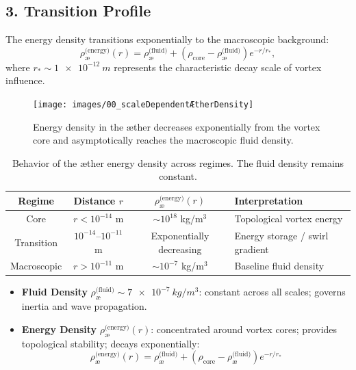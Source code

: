 \subsection*{3. Transition Profile}

The energy density transitions exponentially to the macroscopic background:
\begin{equation}
    \rho_{\text{\ae}}^{\text{(energy)}}(r) =
    \rho_{\text{\ae}}^{\text{(fluid)}} +
    \left(\rho_{\text{core}} - \rho_{\text{\ae}}^{\text{(fluid)}}\right)
    e^{-r/r_*},
\end{equation}
where \( r_* \sim \SI{1e-12}{m} \) represents the characteristic decay scale of vortex influence.

\begin{figure}[htbp]
    \centering
    \texttt{[image: images/00\_scaleDependentÆtherDensity]}
    \caption{Energy density in the æther decreases exponentially from the vortex core and asymptotically reaches the macroscopic fluid density.}
    \label{fig:vortexfields2}
\end{figure}

\begin{table}[h!]
    \centering
    \begin{tabular}{|c|c|c|l|}
        \hline
        Regime & Distance $r$ & $\rho_{\text{\ae}}^{\text{(energy)}}(r)$ & Interpretation \\
        \hline
        Core & $r < 10^{-14}$ m & $\sim 10^{18}$ kg/m$^3$ & Topological vortex energy \\
        Transition & $10^{-14}$–$10^{-11}$ m & Exponentially decreasing & Energy storage / swirl gradient \\
        Macroscopic & $r > 10^{-11}$ m & $\sim 10^{-7}$ kg/m$^3$ & Baseline fluid density \\
        \hline
    \end{tabular}
    \caption{Behavior of the æther energy density across regimes. The fluid density remains constant.}
\end{table}

\begin{tcolorbox}[colback=blue!3, colframe=black!70, sharp corners=southwest, title=Æther Density Types in VAM]
    \begin{itemize}
        \item \textbf{Fluid Density} \(\rho_{\text{\ae}}^{\text{(fluid)}} \sim \SI{7e-7}{kg/m^3}\): constant across all scales; governs inertia and wave propagation.
        \item \textbf{Energy Density} \(\rho_{\text{\ae}}^{\text{(energy)}}(r)\): concentrated around vortex cores; provides topological stability; decays exponentially:
        \[
            \rho_{\text{\ae}}^{\text{(energy)}}(r) = \rho_{\text{\ae}}^{\text{(fluid)}} + \left(\rho_{\text{core}} - \rho_{\text{\ae}}^{\text{(fluid)}}\right) e^{-r/r_*}
        \]
    \end{itemize}
\end{tcolorbox}


